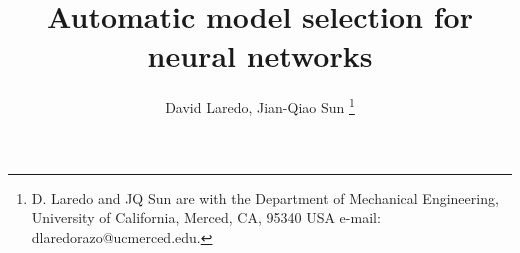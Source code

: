 \documentclass[journal]{IEEEtran}
\begin{document}
%

\title{Automatic model selection for neural networks}
%
%
%

\author{David Laredo, Jian-Qiao Sun%
\thanks{D. Laredo and JQ Sun are with the Department of Mechanical Engineering, University of California, Merced,
CA, 95340 USA e-mail: dlaredorazo@ucmerced.edu.}}%

% 
%
\end{document}
